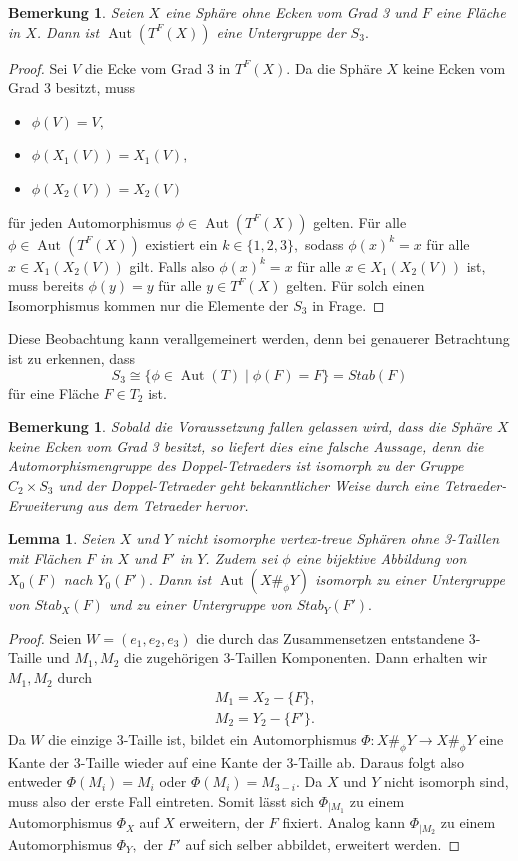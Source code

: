 \documentclass[12pt,titlepage,twoside,cleardoublepage]{article}
\theoremstyle{nummermitklammern}
\newtheorem{lemma}[temp]{Lemma}
\newtheorem{bemerkung}[temp]{Bemerkung}
\newtheorem{lemma}[zahl]{Lemma}
\newtheorem{bemerkung}[zahl]{Bemerkung}
\numberwithin{equation}{section}
\DeclareMathOperator{\Aut}{Aut}
\begin{document}
\begin{bemerkung}
Seien $X$ eine Sphäre ohne Ecken vom Grad 3 und $F$ eine Fläche in $X$. Dann ist $\Aut(T^F(X))$ eine Untergruppe der $S_3.$ 
\end{bemerkung}
\begin{proof}
Sei $V$ die Ecke vom Grad 3 in $T^F(X).$
Da die Sphäre $X$ keine Ecken vom Grad 3 besitzt, muss
\begin{itemize}
\item $\phi(V)=V,$
\item $\phi (X_1(V))=X_1(V),$
\item $\phi (X_2(V))=X_2(V)$
\end{itemize}
für jeden Automorphismus $\phi\in\Aut({T}^F(X))$ gelten. Für alle $\phi\in \Aut(T^F(X))$ existiert ein $k\in\{1,2,3\},$ sodass $\phi(x)^k=x$ für alle $x\in X_1(X_2(V))$ gilt. Falls also $\phi(x)^k=x$ für alle $x \in X_1(X_2(V))$ ist, muss bereits $\phi(y)=y$ für alle $y\in T^F(X)$ gelten. Für solch einen Isomorphismus kommen nur die Elemente der $S_3$ in Frage. 
\end{proof}
Diese Beobachtung kann verallgemeinert werden, denn bei genauerer Betrachtung ist zu erkennen, dass 
\[
S_3\cong\{\phi\in \Aut(T)\mid \phi(F)=F\}=Stab(F)
\] für eine Fläche $F\in T_2$ ist.
\begin{bemerkung}
Sobald die Voraussetzung fallen gelassen wird, dass die Sphäre $X$ keine Ecken vom Grad 3 besitzt, so liefert dies eine falsche Aussage, denn die Automorphismengruppe des Doppel-Tetraeders ist isomorph zu der Gruppe $C_2\times S_3$ und der Doppel-Tetraeder geht bekanntlicher Weise durch eine Tetraeder-Erweiterung aus dem Tetraeder hervor.
\end{bemerkung}
\begin{lemma}
Seien $X$ und $Y$ nicht isomorphe vertex-treue Sphären ohne 3-Taillen mit Flächen $F$ in $X$ und $F'$ in $Y$. Zudem sei $\phi$ eine bijektive Abbildung von $X_0(F)$ nach $Y_0(F').$ Dann ist $\Aut(X\#_\phi Y)$ isomorph zu einer Untergruppe von $Stab_X(F)$ und zu einer Untergruppe von $Stab_Y(F').$
\end{lemma}
\begin{proof}
Seien $W=(e_1,e_2,e_3)$ die durch das Zusammensetzen entstandene 3-Taille und $M_1,M_2$ die zugehörigen 3-Taillen Komponenten. Dann erhalten wir $M_1,M_2$ durch 
\begin{align*}
 &M_1=X_2-\{F\}, \\
 &M_2=Y_2-\{F'\}. 
 \end{align*}
 Da $W$ die einzige 3-Taille ist, bildet ein Automorphismus $\Phi:X\#_{\phi}Y \to X\#_{\phi}Y$  eine Kante der 3-Taille wieder auf eine Kante der 3-Taille ab. Daraus folgt also entweder $\Phi(M_i)=M_i$ oder $\Phi(M_i)=M_{3-i}.$ Da $X$ und $Y$ nicht isomorph sind, muss also der erste Fall eintreten. Somit lässt sich \textsc{$\Phi_{\mid M_1}$} zu einem Automorphismus $\Phi_X$ auf $X$ erweitern, der $F$ fixiert. Analog kann $\Phi_{\mid M_2}$ zu einem Automorphismus $\Phi_Y,$ der $F'$ auf sich selber abbildet, erweitert werden.
\end{proof}
\end{document}
